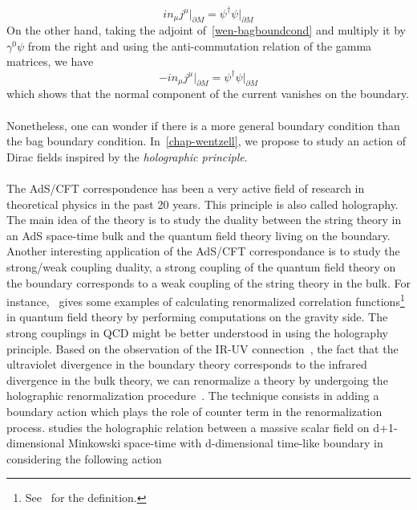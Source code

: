 \begin{equation*}
i n_\mu j^\mu \big\vert_{\partial M}= \psi^\dagger\psi \big\vert_{\partial M}
\end{equation*}
On the other hand, taking the adjoint of~\cref{wen-bagboundcond} and multiply it by $\gamma^0\psi$ from the right and using the anti-commutation relation of the gamma matrices, we have
\begin{equation*}
- i n_\mu j^\mu \big\vert_{\partial M} = \psi^\dagger\psi\big\vert_{\partial M}
\end{equation*}
which shows that the normal component of the current vanishes on the boundary. \\\\
Nonetheless, one can wonder if there is a more general boundary condition than the bag boundary condition. 
In~\cref{chap-wentzell}, we propose to study an action of Dirac fields inspired by the \textit{holographic principle}. \\\\
%
The AdS/CFT correspondence has been a very active field of research in theoretical physics in the past 20 years. 
This principle is also called holography.
The main idea of the theory is to study the duality between the string theory in an AdS space-time bulk and the quantum field theory living on the boundary.
Another interesting application of the AdS/CFT correspondance is to study the strong/weak coupling duality, \ie
a strong coupling of the quantum field theory on the boundary corresponds to a weak coupling of the string theory in the bulk. 
For instance,~\cite{Skenderis2002} gives some examples of calculating renormalized correlation functions\footnote{
See~\eg\cite{Peskin1995} for the definition.
} in quantum field theory by performing computations on the gravity side.
The strong couplings in QCD might be better understood in using the holography principle. 
Based on the observation of the IR-UV connection~\cite{Susskind1998}, 
\ie the fact that the ultraviolet divergence in the boundary theory corresponds to the infrared divergence in the bulk theory, 
we can renormalize a theory by undergoing the holographic renormalization procedure~\cite{Skenderis2002}. 
The technique consists in adding a boundary action which plays the role of counter term in the renormalization process.
\cite{Zahn2016} studies the holographic relation between a massive scalar field on d+1-dimensional Minkowski space-time with d-dimensional time-like boundary in considering the following action
